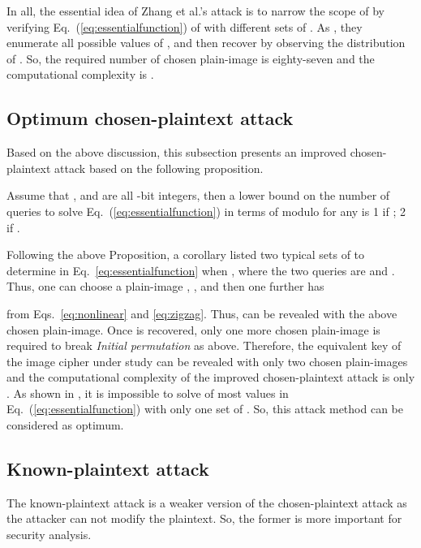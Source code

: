 \documentclass{ws-ijbc}
\begin{document}
In all, the essential idea of Zhang et al.'s attack is to narrow the scope of
 by verifying Eq.~(\ref{eq:essentialfunction}) of  with different sets of .
As , they enumerate all possible values
of , and then recover  by observing the distribution of .
So, the required number of chosen plain-image is eighty-seven
and the computational complexity is .

\subsection{Optimum chosen-plaintext attack}
\label{ssec:ocpa}

Based on the above discussion, this subsection presents an improved chosen-plaintext attack
based on the following proposition.
\begin{proposition}
Assume that , and  are all -bit integers, then a lower bound on the number of queries  to solve
Eq.~(\ref{eq:essentialfunction}) in terms of modulo  for any  is 1 if ; 2 if .
\end{proposition}

Following the above Proposition, a corollary listed two typical sets of 
to determine  in Eq.~\eqref{eq:essentialfunction} when , where
the two queries are  and . Thus, one can choose a plain-image
,
, and then one further has
\begin{linenomath}

\end{linenomath}
from Eqs.~\eqref{eq:nonlinear} and \eqref{eq:zigzag}.
Thus,  can be revealed with the above chosen plain-image.
Once  is recovered,
only one more chosen plain-image is required to break \textit{ Initial permutation} as above. Therefore, the equivalent key of
the image cipher under study can be revealed with only two chosen plain-images and the computational complexity of
the improved chosen-plaintext attack is only . As shown in \cite{Cqli:breakmodulo:IJBC13}, it is impossible to
solve  of most values in Eq.~(\ref{eq:essentialfunction}) with only one set of . So, this attack method can be considered
as optimum.

\subsection{Known-plaintext attack}
\label{ssec:kpa}

The known-plaintext attack is a weaker version of the chosen-plaintext attack
as the attacker can not modify the plaintext. So, the former is more important for security analysis.
\end{document}
